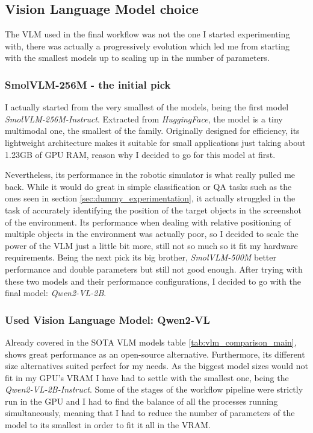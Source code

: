 \subsection{Vision Language Model choice}
The VLM used in the final workflow was not the one I started experimenting with, there was actually a progressively evolution which led me from starting with the smallest models up to scaling up in the number of parameters. 

\subsubsection{SmolVLM-256M - the initial pick}
I actually started from the very smallest of the models, being the first model \textit{SmolVLM-256M-Instruct}. Extracted from \textit{HuggingFace}, the model is a tiny multimodal one, the smallest of the family. Originally designed for efficiency, its lightweight architecture makes it suitable for small applications just taking about 1.23GB of GPU RAM, reason why I decided to go for this model at first.

Nevertheless, its performance in the robotic simulator is what really pulled me back. While it would do great in simple classification or QA tasks such as the ones seen in section \ref{sec:dummy_experimentation}, it actually struggled in the task of accurately identifying the position of the target objects in the screenshot of the environment. Its performance when dealing with relative positioning of multiple objects in the environment was actually poor, so I decided to scale the power of the VLM just a little bit more, still not so much so it fit my hardware requirements. Being the next pick its big brother, \textit{SmolVLM-500M} better performance and double parameters but still not good enough. After trying with these two models and their performance configurations, I decided to go with the final model: \textit{Qwen2-VL-2B}.

\subsubsection{Used Vision Language Model: Qwen2-VL}
Already covered in the SOTA VLM models table \ref{tab:vlm_comparison_main}, shows great performance as an open-source alternative. Furthermore, its different size alternatives suited perfect for my needs. As the biggest model sizes would not fit in my GPU's VRAM I have had to settle with the smallest one, being the \textit{Qwen2-VL-2B-Instruct}. Some of the stages of the workflow pipeline were strictly run in the GPU and I had to find the balance of all the processes running simultaneously, meaning that I had to reduce the number of parameters of the model to its smallest in order to fit it all in the VRAM. 

